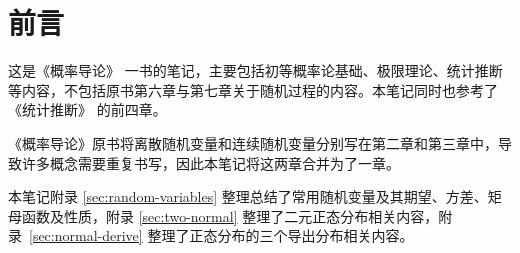 \section*{前言}

这是《概率导论》\cite{bertsekas2008introduction} 一书的笔记，主要包括初等概率论基础、极限理论、统计推断等内容，不包括原书第六章与第七章关于随机过程的内容。本笔记同时也参考了《统计推断》\cite{casella2009statistical} 的前四章。

《概率导论》原书将离散随机变量和连续随机变量分别写在第二章和第三章中，导致许多概念需要重复书写，因此本笔记将这两章合并为了一章。

本笔记附录 \ref{sec:random-variables} 整理总结了常用随机变量及其期望、方差、矩母函数及性质，附录 \ref{sec:two-normal} 整理了二元正态分布相关内容，附录~\ref{sec:normal-derive} 整理了正态分布的三个导出分布相关内容。
